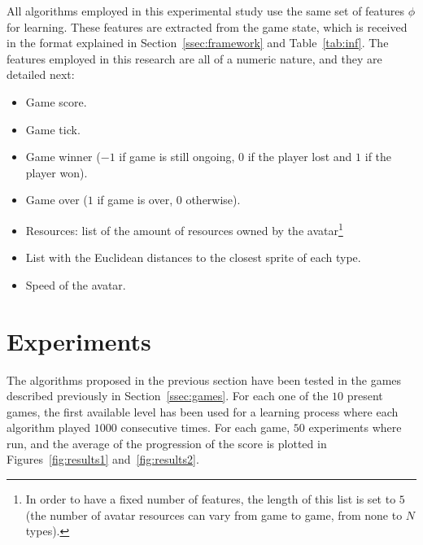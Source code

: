 \documentclass[conference]{IEEEtran}
\newenvironment{mitems}
{\begin{itemize}
\setlength{\itemsep}{1pt}
\setlength{\parskip}{0pt}
\setlength{\parsep}{0pt}}{\end{itemize}}
\begin{document}
All algorithms employed in this experimental study use the same set of features $\phi$ for learning. These features are extracted from the game state, which is received in the format explained in Section~\ref{ssec:framework} and Table~\ref{tab:inf}. The features employed in this research are all of a numeric nature, and they are detailed next:

\begin{mitems}
\item Game score.
\item Game tick.
\item Game winner ($-1$ if game is still ongoing, $0$ if the player lost and $1$ if the player won).
\item Game over ($1$ if game is over, $0$ otherwise).
\item Resources: list of the amount of resources owned by the avatar\footnote{In order to have a fixed number of features, the length of this list is set to $5$ (the number of avatar resources can vary from game to game, from none to $N$ types).}
\item List with the Euclidean distances to the closest sprite of each type. 
\item Speed of the avatar.
\end{mitems}





\section{Experiments} \label{sec:exp}

The algorithms proposed in the previous section have been tested in the games described previously in Section~\ref{ssec:games}. For each one of the $10$ present games, the first available level has been used for a learning process where each algorithm played $1000$ consecutive times. For each game, $50$ experiments where run, and the average of the progression of the score is plotted in Figures~\ref{fig:results1} and~\ref{fig:results2}. 
\end{document}

